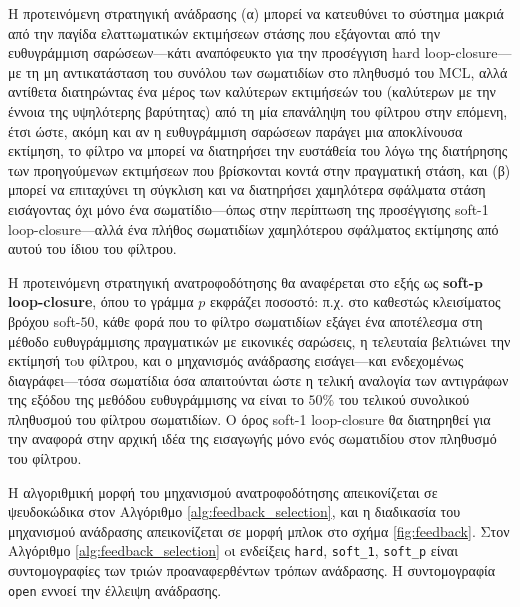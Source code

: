 Η προτεινόμενη στρατηγική ανάδρασης (α) μπορεί να κατευθύνει το σύστημα μακριά
από την παγίδα ελαττωματικών εκτιμήσεων στάσης που εξάγονται από την
ευθυγράμμιση σαρώσεων---κάτι αναπόφευκτο για την προσέγγιση hard
loop-closure---με τη μη αντικατάσταση του συνόλου των σωματιδίων στο πληθυσμό
του MCL, αλλά αντίθετα διατηρώντας ένα μέρος των καλύτερων εκτιμήσεών του
(καλύτερων με την έννοια της υψηλότερης βαρύτητας) από τη μία επανάληψη του
φίλτρου στην επόμενη, έτσι ώστε, ακόμη και αν η ευθυγράμμιση σαρώσεων παράγει
μια αποκλίνουσα εκτίμηση, το φίλτρο να μπορεί να διατηρήσει την ευστάθεία του
λόγω της διατήρησης των προηγούμενων εκτιμήσεων που βρίσκονται κοντά στην
πραγματική στάση, και (β) μπορεί να επιταχύνει τη σύγκλιση και να διατηρήσει
χαμηλότερα σφάλματα στάση εισάγοντας όχι μόνο ένα σωματίδιο---όπως στην
περίπτωση της προσέγγισης soft-1 loop-closure---αλλά ένα πλήθος σωματιδίων
χαμηλότερου σφάλματος εκτίμησης από αυτού του ίδιου του φίλτρου.

Η προτεινόμενη στρατηγική ανατροφοδότησης θα αναφέρεται στο εξής ως
\textbf{soft-}$\bm{p}$ \textbf{loop-closure}, όπου το γράμμα $p$ εκφράζει
ποσοστό: π.χ. στο καθεστώς κλεισίματος βρόχου soft-$50$, κάθε φορά που το
φίλτρο σωματιδίων εξάγει ένα αποτέλεσμα στη μέθοδο ευθυγράμμισης πραγματικών με
εικονικές σαρώσεις, η τελευταία βελτιώνει την εκτίμησή τoυ φίλτρου, και ο
μηχανισμός ανάδρασης εισάγει---και ενδεχομένως διαγράφει---τόσα σωματίδια όσα
απαιτούνται ώστε η τελική αναλογία των αντιγράφων της εξόδου της μεθόδου
ευθυγράμμισης να είναι το $50\%$ του τελικού συνολικού πληθυσμού του φίλτρου
σωματιδίων. Ο όρος soft-1 loop-closure θα διατηρηθεί για την αναφορά στην
αρχική ιδέα της εισαγωγής μόνο ενός σωματιδίου στον πληθυσμό του φίλτρου.

Η αλγοριθμική μορφή του μηχανισμού ανατροφοδότησης απεικονίζεται σε ψευδοκώδικα
στον Αλγόριθμο \ref{alg:feedback_selection}, και η διαδικασία του μηχανισμού
ανάδρασης απεικονίζεται σε μορφή μπλοκ στο σχήμα \ref{fig:feedback}.  Στον
Αλγόριθμο \ref{alg:feedback_selection} oι ενδείξεις \texttt{hard},
\texttt{soft\_1}, \texttt{soft\_p} είναι συντομογραφίες των τριών
προαναφερθέντων τρόπων ανάδρασης. Η συντομογραφία \texttt{open} εννοεί την
έλλειψη ανάδρασης.


